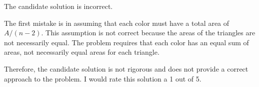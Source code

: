 The candidate solution is incorrect.

The first mistake is in assuming that each color must have a total area of $A/(n-2)$. This assumption is not correct because the areas of the triangles are not necessarily equal. The problem requires that each color has an equal sum of areas, not necessarily equal areas for each triangle. 

Therefore, the candidate solution is not rigorous and does not provide a correct approach to the problem. I would rate this solution a 1 out of 5.
